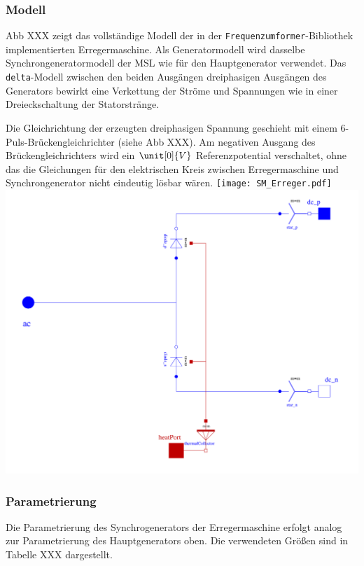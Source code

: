 \hypertarget{modell-2}{%
\subsubsection{Modell}\label{modell-2}}

Abb XXX zeigt das vollständige Modell der in der
\texttt{Frequenzumformer}-Bibliothek implementierten Erregermaschine.
Als Generatormodell wird dasselbe Synchrongeneratormodell der MSL wie
für den Hauptgenerator verwendet. Das \texttt{delta}-Modell zwischen den
beiden Ausgängen dreiphasigen Ausgängen des Generators bewirkt eine
Verkettung der Ströme und Spannungen wie in einer Dreieckschaltung der
Statorstränge.

Die Gleichrichtung der erzeugten dreiphasigen Spannung geschieht mit
einem 6-Puls-Brückengleichrichter (siehe Abb XXX). Am negativen Ausgang
des Brückengleichrichters wird ein \(\unit[0]{V}\) Referenzpotential
verschaltet, ohne das die Gleichungen für den elektrischen Kreis
zwischen Erregermaschine und Synchrongenerator nicht eindeutig lösbar
wären. \texttt{[image: SM\_Erreger.pdf]}
\includegraphics{Bilder/DiodeBridge2mPulse.pdf}

\hypertarget{parametrierung-2}{%
\subsubsection{Parametrierung}\label{parametrierung-2}}

Die Parametrierung des Synchrogenerators der Erregermaschine erfolgt
analog zur Parametrierung des Hauptgenerators oben. Die verwendeten
Größen sind in Tabelle XXX dargestellt.

